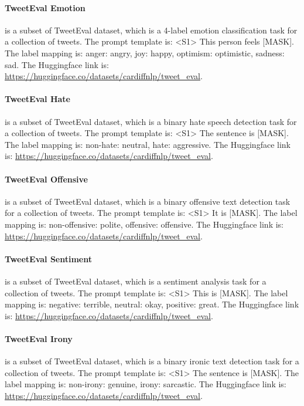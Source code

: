\paragraph{TweetEval Emotion} \citep{mohammad2018semeval} is a subset of TweetEval \citep{barbieri2020tweeteval} dataset, which is a 4-label emotion classification task for a collection of tweets. The prompt template is: \textless{}S1\textgreater{} This person feels {[}MASK{]}. The label mapping is: anger: angry, joy: happy, optimism: optimistic, sadness: sad. The Huggingface link is: \url{https://huggingface.co/datasets/cardiffnlp/tweet_eval}.

\paragraph{TweetEval Hate} \citep{basile-etal-2019-semeval} is a subset of TweetEval \citep{barbieri2020tweeteval} dataset, which is a binary hate speech detection task for a collection of tweets. The prompt template is: \textless{}S1\textgreater{} The sentence is {[}MASK{]}. The label mapping is: non-hate: neutral, hate: aggressive. The Huggingface link is: \url{https://huggingface.co/datasets/cardiffnlp/tweet_eval}.

\paragraph{TweetEval Offensive} \citep{zampieri2019semeval} is a subset of TweetEval \citep{barbieri2020tweeteval} dataset, which is a binary offensive text detection task for a collection of tweets. The prompt template is: \textless{}S1\textgreater{} It is {[}MASK{]}. The label mapping is: non-offensive: polite, offensive: offensive. The Huggingface link is: \url{https://huggingface.co/datasets/cardiffnlp/tweet_eval}.

\paragraph{TweetEval Sentiment} \citep{rosenthal2017semeval} is a subset of TweetEval \citep{barbieri2020tweeteval} dataset, which is a sentiment analysis task for a collection of tweets. The prompt template is: \textless{}S1\textgreater{} This is {[}MASK{]}. The label mapping is: negative: terrible, neutral: okay, positive: great. The Huggingface link is: \url{https://huggingface.co/datasets/cardiffnlp/tweet_eval}.

\paragraph{TweetEval Irony} \citep{van2018semeval} is a subset of TweetEval \citep{barbieri2020tweeteval} dataset, which is a binary ironic text detection task for a collection of tweets. The prompt template is: \textless{}S1\textgreater{} The sentence is {[}MASK{]}. The label mapping is: non-irony: genuine, irony: sarcastic.  The Huggingface link is: \url{https://huggingface.co/datasets/cardiffnlp/tweet_eval}.


